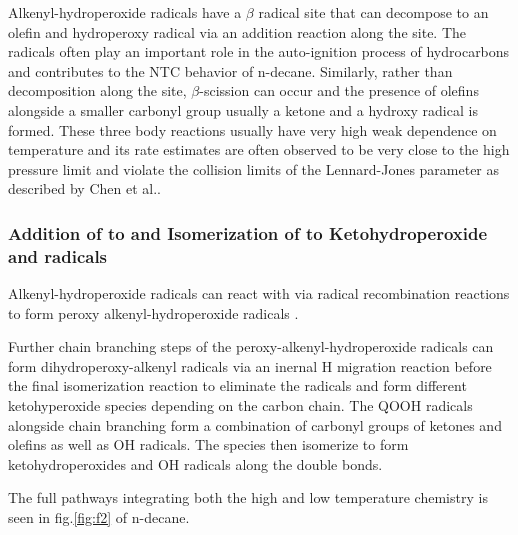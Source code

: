Alkenyl-hydroperoxide radicals  have a $\beta$ radical site that can decompose to an olefin and hydroperoxy radical  via an addition reaction along the  site. The  radicals often play an important role in the auto-ignition process of hydrocarbons and contributes to the NTC behavior of n-decane. Similarly, rather than decomposition along the  site, $\beta$-scission can occur and the presence of olefins alongside a smaller carbonyl group usually a ketone and a hydroxy radical  is formed. These three body reactions usually have very high weak dependence on temperature and its rate estimates are often observed to be very close to the high pressure limit and violate the collision limits of the Lennard-Jones parameter as described by Chen et al.\cite{Chen2017ViolationModels}. 


\subsubsection{Addition of  to  and Isomerization of  to Ketohydroperoxide and  radicals}
Alkenyl-hydroperoxide  radicals can react with  via radical recombination reactions to form peroxy alkenyl-hydroperoxide radicals . 
 
 Further chain branching steps of the peroxy-alkenyl-hydroperoxide radicals can form  dihydroperoxy-alkenyl radicals via an inernal H migration reaction before the final isomerization reaction to eliminate the  radicals and form different ketohyperoxide species depending on the carbon chain. The QOOH radicals alongside chain branching form a combination of carbonyl groups of ketones and olefins as well as OH radicals. The  species then isomerize to form ketohydroperoxides and OH radicals along the double bonds.  
 
 The full pathways integrating both the high and low temperature chemistry is seen in fig.\ref{fig:f2} of n-decane.

